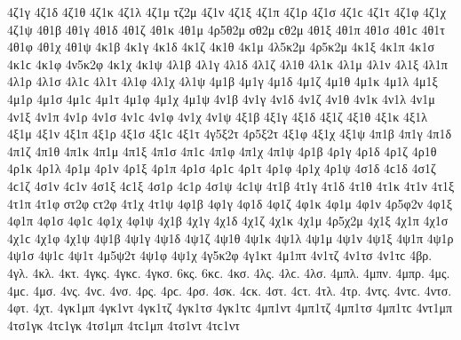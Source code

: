 {4ζ1γ   %
4ζ1δ 
4ζ1θ 
4ζ1κ 
4ζ1λ 
4ζ1μ 
τζ2μ   %
4ζ1ν 
4ζ1ξ 
4ζ1π 
4ζ1ρ 
4ζ1σ 4ζ1ϲ 
4ζ1τ 
4ζ1φ 
4ζ1χ 
4ζ1ψ 
4θ1β 
4θ1γ 
4θ1δ 
4θ1ζ 
4θ1κ 
4θ1μ 
4ρ5θ2μ   %
σθ2μ ϲθ2μ   %
4θ1ξ 
4θ1π 
4θ1σ 4θ1ϲ 
4θ1τ 
4θ1φ 
4θ1χ 
4θ1ψ 
4κ1β   %
4κ1γ 
4κ1δ 
4κ1ζ 
4κ1θ 
4κ1μ 
4λ5κ2μ   %
4ρ5κ2μ   %
4κ1ξ 
4κ1π 
4κ1σ 4κ1ϲ 
4κ1φ 
4ν5κ2φ   %
4κ1χ 
4κ1ψ 
4λ1β 
4λ1γ 
4λ1δ 
4λ1ζ 
4λ1θ 
4λ1κ 
4λ1μ 
4λ1ν 
4λ1ξ 
4λ1π 
4λ1ρ 
4λ1σ 4λ1ϲ 
4λ1τ 
4λ1φ 
4λ1χ 
4λ1ψ 
4μ1β 
4μ1γ 
4μ1δ 
4μ1ζ 
4μ1θ 
4μ1κ 
4μ1λ 
4μ1ξ 
4μ1ρ 
4μ1σ 4μ1ϲ 
4μ1τ 
4μ1φ 
4μ1χ 
4μ1ψ 
4ν1β 
4ν1γ 
4ν1δ 
4ν1ζ 
4ν1θ 
4ν1κ 
4ν1λ 
4ν1μ 
4ν1ξ 
4ν1π 
4ν1ρ 
4ν1σ 4ν1ϲ 
4ν1φ 
4ν1χ 
4ν1ψ 
4ξ1β 
4ξ1γ 
4ξ1δ 
4ξ1ζ 
4ξ1θ 
4ξ1κ 
4ξ1λ 
4ξ1μ 
4ξ1ν 
4ξ1π 
4ξ1ρ 
4ξ1σ 4ξ1ϲ 
4ξ1τ 
4γ5ξ2τ   %
4ρ5ξ2τ   %
4ξ1φ 
4ξ1χ 
4ξ1ψ 
4π1β 
4π1γ 
4π1δ 
4π1ζ 
4π1θ 
4π1κ 
4π1μ 
4π1ξ 
4π1σ 4π1ϲ 
4π1φ 
4π1χ 
4π1ψ 
4ρ1β 
4ρ1γ 
4ρ1δ 
4ρ1ζ 
4ρ1θ 
4ρ1κ 
4ρ1λ 
4ρ1μ 
4ρ1ν 
4ρ1ξ 
4ρ1π 
4ρ1σ 4ρ1ϲ 
4ρ1τ 
4ρ1φ 
4ρ1χ 
4ρ1ψ 
4σ1δ 4ϲ1δ   %
4σ1ζ 4ϲ1ζ 
4σ1ν 4ϲ1ν   %
4σ1ξ 4ϲ1ξ 
4σ1ρ 4ϲ1ρ 
4σ1ψ 4ϲ1ψ 
4τ1β 
4τ1γ 
4τ1δ 
4τ1θ 
4τ1κ 
4τ1ν 
4τ1ξ 
4τ1π 
4τ1φ 
στ2φ ϲτ2φ   %
4τ1χ 
4τ1ψ 
4φ1β 
4φ1γ 
4φ1δ 
4φ1ζ 
4φ1κ   %
4φ1μ 
4φ1ν 
4ρ5φ2ν   %
4φ1ξ 
4φ1π 
4φ1σ 4φ1ϲ 
4φ1χ 
4φ1ψ 
4χ1β 
4χ1γ 
4χ1δ 
4χ1ζ 
4χ1κ 
4χ1μ 
4ρ5χ2μ   %
4χ1ξ 
4χ1π 
4χ1σ 4χ1ϲ 
4χ1φ 
4χ1ψ 
4ψ1β 
4ψ1γ 
4ψ1δ 
4ψ1ζ 
4ψ1θ 
4ψ1κ 
4ψ1λ 
4ψ1μ 
4ψ1ν 
4ψ1ξ 
4ψ1π 
4ψ1ρ 
4ψ1σ 4ψ1ϲ 
4ψ1τ 
4μ5ψ2τ   %
4ψ1φ 
4ψ1χ 
4γ5κ2φ   %
4γ1κτ   %
4μ1πτ   %
4ν1τζ   %
4ν1τσ 4ν1τϲ   %
4βρ.   %
4γλ.   %
4κλ.   %
4κτ.   %
4γκς. 4γκϲ.   %
4γκσ. 
6κς. 6κϲ.   %
4κσ. 
4λς. 4λϲ.   %
4λσ. 
4μπλ.   %
4μπν.   %
4μπρ.   %
4μς. 4μϲ.   %
4μσ. 
4νς. 4νϲ.   %
4νσ. 
4ρς. 4ρϲ.   %
4ρσ. 
4σκ. 4ϲκ.   %
4στ. 4ϲτ.   %
4τλ.   %
4τρ.   %
4ντς. 4ντϲ.   %
4ντσ. 
4φτ.   %
4χτ.   %
4γκ1μπ 
4γκ1ντ 
4γκ1τζ 
4γκ1τσ 4γκ1τϲ 
4μπ1ντ 
4μπ1τζ 
4μπ1τσ 4μπ1τϲ 
4ντ1μπ 
4τσ1γκ 4τϲ1γκ 
4τσ1μπ 4τϲ1μπ 
4τσ1ντ 4τϲ1ντ 
}

